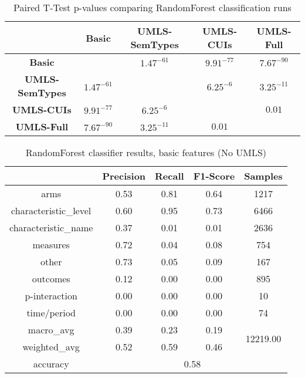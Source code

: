 \begin{table}
	\centering
	\setlength{\tabcolsep}{0.5em} %
	{\renewcommand{\arraystretch}{1.2}%
	\begin{tabular}{c|c|c|c|c}
		\cellcolor{black!50} & \textbf{Basic} & \textbf{UMLS-SemTypes}  & \textbf{UMLS-CUIs}  & \textbf{UMLS-Full} \\ 
		\hline 
		\textbf{Basic} &  \cellcolor{black!50} & $1.47^{-61}$ & $9.91^{-77}$ & $7.67^{-90}$ \\ 
		\hline 
		\textbf{UMLS-SemTypes} & $1.47^{-61}$ & \cellcolor{black!50} & $6.25^{-6}$ & $3.25^{-11}$ \\ 
		\hline 
		\textbf{UMLS-CUIs} & $9.91^{-77}$ & $6.25^{-6}$ & \cellcolor{black!50} & $0.01$ \\ 
		\hline 
		\textbf{UMLS-Full} & $7.67^{-90}$ & $3.25^{-11}$ & $0.01$ & \cellcolor{black!50} \\ 
	\end{tabular}
	}
	
	\caption{ \label{tab:stat-diff} Paired T-Test p-values comparing RandomForest classification runs }
\end{table}


\begin{table}
	\centering
	\begin{tabular}{c|c|c|c|c}

		
		&\textbf{Precision} &  \textbf{Recall} & \textbf{F1-Score} & \textbf{Samples} \\
		\hline 
		\hline 
		arms & 0.53 & 0.81 & 0.64 & 1217 \\
		\hline
		characteristic\_level & 0.60 & 0.95 & 0.73 & 6466 \\
		\hline
		characteristic\_name & 0.37 & 0.01 & 0.01 & 2636 \\
		\hline
		measures & 0.72 & 0.04 & 0.08 & 754 \\
		\hline
		other & 0.73 & 0.05 & 0.09 & 167 \\
		\hline
		outcomes & 0.12 & 0.00 & 0.00 & 895 \\
		\hline
		p-interaction & 0.00 & 0.00 & 0.00 & 10 \\
		\hline
		time/period & 0.00 & 0.00 & 0.00 & 74 \\
		\hline
		\hline
		
		macro\_avg & 0.39 & 0.23 & 0.19 & \multirow{2}{*}{12219.00}  \\
		\cline{1-4}
		weighted\_avg & 0.52 & 0.59 & 0.46 & \\
		\hline
		\hline	
		accuracy&\multicolumn{4}{c}{0.58} \\ 
		\hline
	\end{tabular} 
	\caption{\label{tab:RF-basic} RandomForest classifier results, basic features (No UMLS)  }
\end{table}


